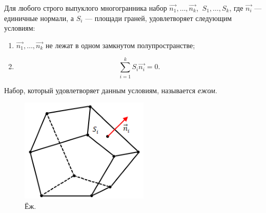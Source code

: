 \begin{statement}
    Для любого строго выпуклого многогранника набор $\overrightarrow{n_1}, \dots, \overrightarrow{n_k}$, $\ S_1, \dots, S_k$, где $\overrightarrow{n_i}$ — единичные нормали, а $S_i$ — площади граней, удовлетворяет следующим условиям:
    \begin{enumerate}
        \item $\overrightarrow{n_1}, \dots, \overrightarrow{n_k}$ не лежат в одном замкнутом полупространстве;
        \item \[\sum_{i=1}^{k}S_i \overrightarrow{n_i} = 0.\]
    \end{enumerate}
    Набор, который удовлетворяет данным условиям, называется \textit{ежом}.

    \begin{figure}[ht]
        \centering
        \includegraphics[scale=0.8]{images/c7.6.png}
        \caption{Ёж.}
        \label{fig:c7.6}
    \end{figure}
\end{statement}
